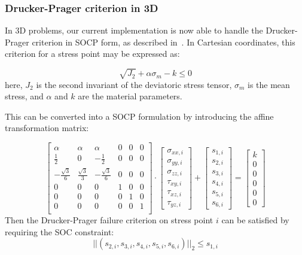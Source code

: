 \subsubsection{Drucker-Prager criterion in 3D}

In 3D problems, our current implementation is now able to handle the Drucker-Prager criterion in SOCP form, as described in~\cite{2DLB}. In Cartesian coordinates, this criterion for a stress point may be expressed as:

\begin{equation}
\sqrt{J_2} + \alpha \sigma_m - k \leq 0
\label{eq:VM}
\end{equation} here, $J_2$ is the second invariant of the deviatoric stress tensor, $\sigma_m$ is the mean stress, and $\alpha$ and $k$ are the material parameters.

This can be converted into a SOCP formulation by introducing the affine transformation matrix:

\begin{equation}
\begin{bmatrix}
\alpha & \alpha & \alpha & 0 & 0 & 0 \\
\frac{1}{2}  & 0 & -\frac{1}{2} & 0  & 0 & 0\\
-\frac{\sqrt{3}}{6} & \frac{\sqrt{3}}{3} & -\frac{\sqrt{3}}{6} & 0 & 0 & 0\\

0 & 0 & 0 & 1 & 0 & 0 \\
0 & 0 & 0 & 0 & 1 & 0 \\
0 & 0 & 0 & 0 & 0 & 1 \\
\end{bmatrix}
\cdot
\begin{bmatrix}
\sigma_{xx, i} \\
\sigma_{yy, i} \\
\sigma_{zz, i} \\
\tau_{xy, i} \\
\tau_{xz, i} \\
\tau_{yz, i}
\end{bmatrix}
+
\begin{bmatrix}

s_{1,i} \\
s_{2,i} \\
s_{3,i} \\
s_{4,i} \\
s_{5,i} \\
s_{6,i}
\end{bmatrix}
=
\begin{bmatrix}
k \\
0 \\
0 \\
0 \\
0 \\
0
\end{bmatrix}
\label{eq:3DSOC}
\end{equation} Then the Drucker-Prager failure criterion on stress point $i$ can be satisfied by requiring the SOC constraint:
\begin{equation}
||(s_{2,i}, s_{3,i}, s_{4,i}, s_{5,i}, s_{6,i})||_2 \leq s_{1,i}
\label{eq:3DConic}
\end{equation}


